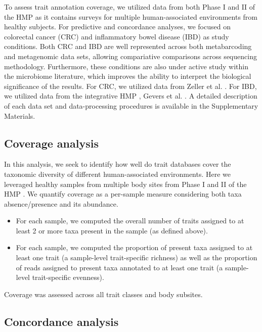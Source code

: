 \documentclass{bmcart}
\begin{document}
\noindent To assess trait annotation coverage, we utilized data from both Phase I and II of the HMP \cite{consortium2012structure} as it contains surveys for multiple human-associated environments from healthy subjects. For predictive and concordance analyses, we focused on colorectal cancer (CRC) and inflammatory bowel disease (IBD) as study conditions. Both CRC and IBD are well represented across both metabarcoding and metagenomic data sets, allowing compariative comparisons across sequencing methodology. Furthermore, these conditions are also under active study within the microbiome literature, which improves the ability to interpret the biological significance of the results. For CRC, we utilized data from Zeller et al. \cite{zeller2014potential}. For IBD, we utilized data from the integrative HMP \cite{proctor2019integrative}, Gevers et al. \cite{gevers2014treatmentnaive}. A detailed description of each data set and data-processing procedures is available in the Supplementary Materials. 

\subsection*{Coverage analysis}  

In this analysis, we seek to identify how well do trait databases cover the taxonomic diversity of different human-associated environments. Here we leveraged healthy samples from multiple body sites from Phase I and II of the HMP \cite{consortium2012structure}. We quantify coverage as a per-sample measure considering both taxa absence/presence and its abundance.   
\begin{itemize}
    \item For each sample, we computed the overall number of traits assigned to at least 2 or more taxa present in the sample (as defined above).  
    \item For each sample, we computed the proportion of present taxa assigned to at least one trait (a sample-level trait-specific richness) as well as the proportion of reads assigned to present taxa annotated to at least one trait (a sample-level trait-specific evenness).
\end{itemize}

\noindent Coverage was assessed across all trait classes and body subsites. 

\subsection*{Concordance analysis}
\end{document}
